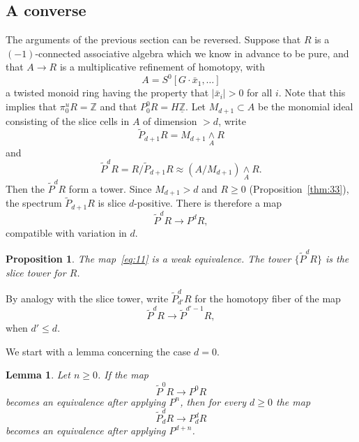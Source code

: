 \documentclass{amsart}
\newtheorem{lem}[equation]{Lemma}
\newtheorem{prop}[equation]{Proposition}
\theoremstyle{definition}
\theoremstyle{remark}
\newcommand{\Z}{{\mathbb Z}}
\newcommand{\smashove}[1]{\underset{#1}{\wedge}}
\newcommand{\piu}{\pi^{u}}
\newcommand{\Zm}{\underline{\Z}}
\newcommand{\gbar}{\bar}
\begin{document}
\subsection{A converse}
\label{sec:converse}

The arguments of the previous section can be reversed.  Suppose that
$R$ is a $(-1)$-connected associative algebra which we know in advance
to be pure, and that $A\to R$ is a multiplicative refinement of
homotopy, with 
\[
A=S^{0}[G\cdot\gbar{x}_{1},\dots]
\]
a twisted monoid ring having the property that $|\gbar{x}_{i}|>0$ for
all $i$.  Note that this implies that $\piu_{0}R=\Z$ and that
$P_{0}^{0}R=H\Zm$.  Let $M_{d+1}\subset A$ be the monomial ideal
consisting of the slice cells in $A$ of dimension $> d$, write
\[
\tilde P_{d+1}R = M_{d+1}\smashove{A}R 
\]
and
\[
\tilde P^{d}R = R/\tilde P_{d+1}R \approx (A/M_{d+1})\smashove{A}R.
\]
Then the $\tilde P^{d}R$ form a tower. Since $M_{d+1}> d$ and $R\ge 0$
(Proposition~\ref{thm:33}), the spectrum $\tilde P_{d+1}R$ is slice
$d$-positive.  There is therefore a map
\begin{equation}
\label{eq:11}
\tilde P^{d}R\to P^{d}R,
\end{equation}
compatible with variation in $d$.  

\begin{prop}
\label{thm:112}
The map~\eqref{eq:11} is a weak equivalence.   The tower $\{\tilde
P^{d}R \}$ is the slice tower for $R$.
\end{prop}

By analogy with the slice tower, write  $\tilde P_{d'}^{d}R$
for the homotopy fiber of the map
\[
\tilde P^{d}R\to \tilde P^{d'-1}R,
\]
when $d'\le d$.

We start with a lemma concerning the case $d=0$.

\begin{lem}
\label{thm:131}
Let $n\ge 0$.   If the map 
\[
\tilde P^{0}R\to P^{0}R
\]
becomes an equivalence after applying $P^{n}$, then for every
$d\ge 0$ the map
\[
\tilde P_{d}^{d}R \to P_{d}^{d}R
\]
becomes an equivalence after applying $P^{d+n}$.
\end{lem}
\end{document}

